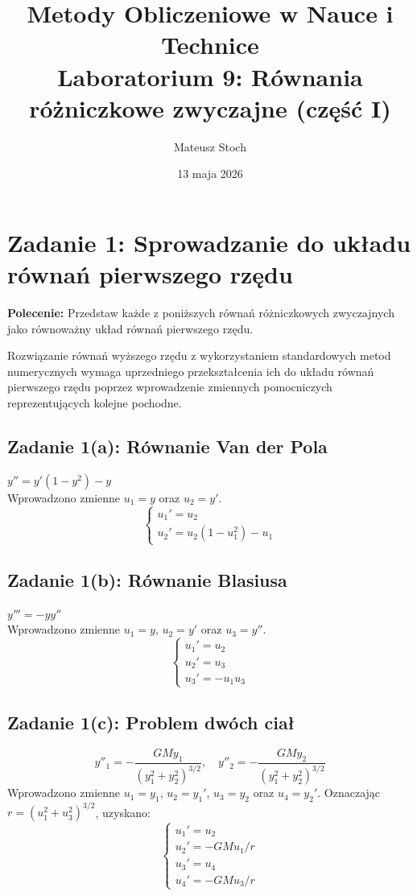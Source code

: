\documentclass[12pt, a4paper]{article}
\title{
  \textbf{Metody Obliczeniowe w Nauce i Technice} \\[0.5em]
  \large Laboratorium 9: Równania różniczkowe zwyczajne (część I)
}
\author{Mateusz Stoch}
\date{13 maja 2026}
\begin{document}
\maketitle

\section{Zadanie 1: Sprowadzanie do układu równań pierwszego rzędu}
\textbf{Polecenie:} Przedstaw każde z poniższych równań różniczkowych zwyczajnych jako równoważny układ równań pierwszego rzędu.

Rozwiązanie równań wyższego rzędu z wykorzystaniem standardowych metod numerycznych wymaga uprzedniego przekształcenia ich do układu równań pierwszego rzędu poprzez wprowadzenie zmiennych pomocniczych reprezentujących kolejne pochodne.

\subsection{Zadanie 1(a): Równanie Van der Pola}
$y'' = y'(1 - y^2) - y$ \\
Wprowadzono zmienne $u_1 = y$ oraz $u_2 = y'$.
\[
  \begin{cases}
    u_1' = u_2 \\
    u_2' = u_2(1 - u_1^2) - u_1
  \end{cases}
\]

\subsection{Zadanie 1(b): Równanie Blasiusa}
$y''' = -yy''$ \\
Wprowadzono zmienne $u_1 = y$, $u_2 = y'$ oraz $u_3 = y''$.
\[
  \begin{cases}
    u_1' = u_2 \\
    u_2' = u_3 \\
    u_3' = -u_1 u_3
  \end{cases}
\]

\subsection{Zadanie 1(c): Problem dwóch ciał}
\[ y''_1 = -\frac{GMy_1}{(y_1^2 + y_2^2)^{3/2}}, \quad y''_2 = -\frac{GMy_2}{(y_1^2 + y_2^2)^{3/2}} \]
Wprowadzono zmienne $u_1 = y_1$, $u_2 = y_1'$, $u_3 = y_2$ oraz $u_4 = y_2'$. Oznaczając $r = (u_1^2 + u_3^2)^{3/2}$, uzyskano:
\[
  \begin{cases}
    u_1' = u_2 \\
    u_2' = -GM u_1 / r \\
    u_3' = u_4 \\
    u_4' = -GM u_3 / r
  \end{cases}
\]
\end{document}
